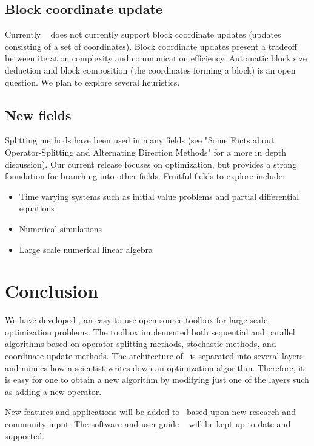 \subsection{Block coordinate update}
  Currently \pkg~ does not currently support block coordinate updates (updates consisting of a set of coordinates). Block coordinate updates present a tradeoff between iteration complexity and communication efficiency.
  Automatic block size deduction and block composition (the coordinates forming a block) is an open question.
We plan to explore several heuristics.

\subsection{New fields}

Splitting methods have been used in many fields (see "Some Facts about Operator-Splitting and
Alternating Direction Methods" for a more in depth discussion).
Our current release focuses on optimization, but provides a strong foundation for branching into other fields.
Fruitful fields to explore include:

\begin{itemize}
\item Time varying systems such as initial value problems and partial differential equations
\item Numerical simulations
\item Large scale numerical linear algebra 
\end{itemize}


\section{Conclusion }
We have developed \pkg, an easy-to-use open source toolbox for large scale optimization problems.
The toolbox implemented both sequential and parallel algorithms based on operator splitting methods, stochastic methods,
and coordinate update methods. The architecture of \pkg~is separated into several layers and mimics how a scientist writes down an optimization algorithm. Therefore, it is easy for one to obtain a new algorithm by modifying just one of the layers such as adding a new operator.


New features and applications will be added to \pkg~based upon new research and community input. The software and user guide \repo~ will be kept up-to-date and supported.
